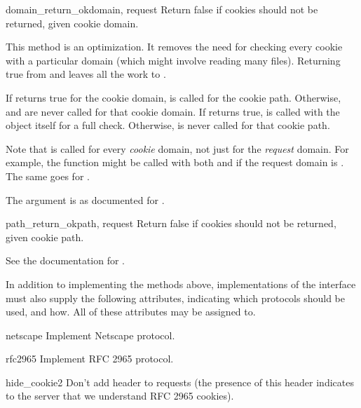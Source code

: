 \begin{methoddesc}[CookiePolicy]{domain_return_ok}{domain, request}
Return false if cookies should not be returned, given cookie domain.

This method is an optimization.  It removes the need for checking
every cookie with a particular domain (which might involve reading
many files).  Returning true from  and
 leaves all the work to .

If  returns true for the cookie domain,
 is called for the cookie path.  Otherwise,
 and  are never called
for that cookie domain.  If  returns true,
 is called with the  object itself
for a full check.  Otherwise,  is never called for
that cookie path.

Note that  is called for every
\emph{cookie} domain, not just for the \emph{request} domain.  For
example, the function might be called with both 
and  if the request domain is
.  The same goes for
.

The  argument is as documented for .
\end{methoddesc}

\begin{methoddesc}[CookiePolicy]{path_return_ok}{path, request}
Return false if cookies should not be returned, given cookie path.

See the documentation for .
\end{methoddesc}


In addition to implementing the methods above, implementations of the
 interface must also supply the following
attributes, indicating which protocols should be used, and how.  All
of these attributes may be assigned to.

\begin{memberdesc}[CookiePolicy]{netscape}
Implement Netscape protocol.
\end{memberdesc}
\begin{memberdesc}[CookiePolicy]{rfc2965}
Implement RFC 2965 protocol.
\end{memberdesc}
\begin{memberdesc}[CookiePolicy]{hide_cookie2}
Don't add  header to requests (the presence of
this header indicates to the server that we understand RFC 2965
cookies).
\end{memberdesc}

